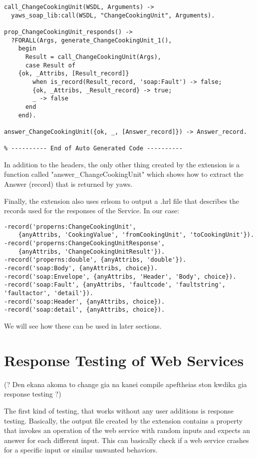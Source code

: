 \documentclass[submission,copyright,a4]{eptcs}
\begin{document}
\begin{lstlisting}
call_ChangeCookingUnit(WSDL, Arguments) ->
  yaws_soap_lib:call(WSDL, "ChangeCookingUnit", Arguments).

prop_ChangeCookingUnit_responds() ->
  ?FORALL(Args, generate_ChangeCookingUnit_1(),
    begin
      Result = call_ChangeCookingUnit(Args),
      case Result of
	{ok, _Attribs, [Result_record]} 
	    when is_record(Result_record, 'soap:Fault') -> false;
        {ok, _Attribs, _Result_record} -> true;
        _ -> false
      end
    end).

answer_ChangeCookingUnit({ok, _, [Answer_record]}) -> Answer_record.

% ---------- End of Auto Generated Code ---------- 
\end{lstlisting}

In addition to the headers, the only other thing created by the extension is a function called "answer\_ChangeCookingUnit" which shows how to extract the Answer (record) that is returned by yaws.

Finally, the extension also uses erlsom to output a .hrl file that describes the records used for the responses of the Service. In our case:

\begin{lstlisting}
-record('properns:ChangeCookingUnit', 
	{anyAttribs, 'CookingValue', 'fromCookingUnit', 'toCookingUnit'}).
-record('properns:ChangeCookingUnitResponse', 
	{anyAttribs, 'ChangeCookingUnitResult'}).
-record('properns:double', {anyAttribs, 'double'}).
-record('soap:Body', {anyAttribs, choice}).
-record('soap:Envelope', {anyAttribs, 'Header', 'Body', choice}).    
-record('soap:Fault', {anyAttribs, 'faultcode', 'faultstring', 'faultactor', 'detail'}).  
-record('soap:Header', {anyAttribs, choice}).
-record('soap:detail', {anyAttribs, choice}).
\end{lstlisting}

We will see how these can be used in later sections.

\section{Response Testing of Web Services}

(? Den ekana akoma to change gia na kanei compile apeftheias ston kwdika gia response testing ?)

The first kind of testing, that works without any user additions is response testing. Basically, the output file created by the extension contains a property that invokes an operation of the web service with random inputs and expects an answer for each different input. This can basically check if a web service crashes for a specific input or similar unwanted behaviors. 
\end{document}

